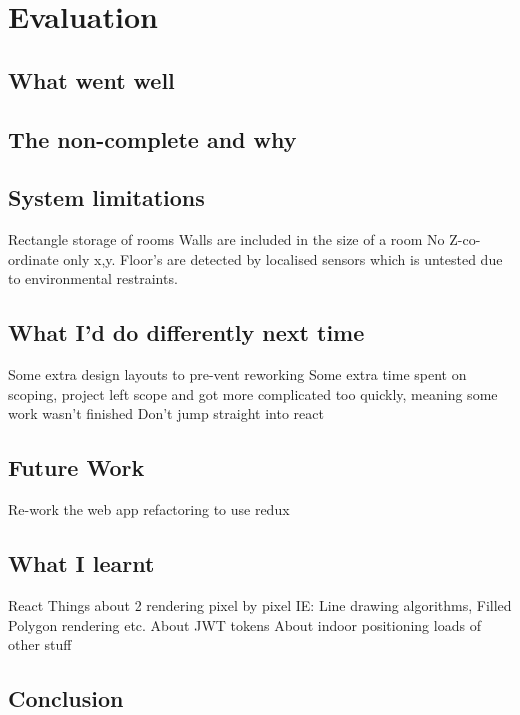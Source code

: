 \section{Evaluation}

\subsection{What went well} %

\subsection{The non-complete and why}

\subsection{System limitations} 
Rectangle storage of rooms
Walls are included in the size of a room
No Z-co-ordinate only x,y. Floor's are detected by localised sensors which is untested due to environmental restraints.

\subsection{What I'd do differently next time}
Some extra design layouts to pre-vent reworking
Some extra time spent on scoping, project left scope and got more complicated too quickly, meaning some work wasn't finished
Don't jump straight into react

\subsection{Future Work}
Re-work the web app refactoring to use redux

\subsection{What I learnt} %
React
Things about 2 rendering pixel by pixel IE: Line drawing algorithms, Filled Polygon rendering etc.
About JWT tokens
About indoor positioning
loads of other stuff

\subsection{Conclusion}
